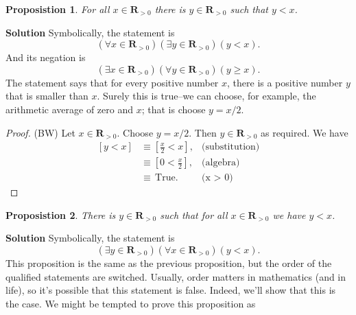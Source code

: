 \documentclass[12pt,fleqn,answers]{exam}
\newcommand{\reals}{\mathbf{R}}
\newcommand{\true}{\, \mathrm{True}}
\newenvironment{myproof}
  {\begin{shaded}\begin{proof}}
  {\end{proof}\end{shaded}}
\newtheorem{prop}{Proposistion}
\begin{document}
    \begin{prop}   For all $x \in \reals_{>0}$ there is 
      $y \in \reals_{> 0}$ such that $y < x$. 
    \end{prop}
     
    \noindent \textbf{Solution} Symbolically, the statement is 
      \begin{equation*}
         \left(\forall x \in \reals_{>0}\right) \left(\exists y \in \reals_{>0}\right)(y < x).
      \end{equation*}
      And its negation is
       \begin{equation*}
         \left(\exists x \in \reals_{>0}\right) \left(\forall y \in \reals_{>0}\right)(y \geq  x).
      \end{equation*}
      The statement says that for every positive number $x$, there is a positive number $y$ that is smaller than $x$. 
      Surely this is true--we can choose, for example, the 
      arithmetic average of zero and $x$; that is choose     
      $y=x/2$.
      
      \begin{myproof} (BW) Let $x \in \reals_{>0}$. Choose $y = x/2$. Then $y \in \reals_{>0}$ as required. We have
         \begin{align*}
         \left[y < x \right] &\equiv \left[\frac{x}{2} < x \right], &\mbox{(substitution)} \\
                                   &\equiv \left[0 < \frac{x}{2}  \right], &\mbox{(algebra)} \\
                                   &\equiv \true.  &\mbox{(x > 0)}
      \end{align*}
      \end{myproof}

      
      \begin{prop} There is $y \in \reals_{> 0}$ such that for all 
        $x \in \reals_{>0}$ we have $y < x$.
      \end{prop}
       
      \noindent \textbf{Solution}  Symbolically, the statement is
       \begin{equation*}
         \left(\exists y \in \reals_{>0}\right)\left(\forall x \in \reals_{>0}\right) \left(y < x \right).
       \end{equation*}
       This proposition is the same as the previous proposition, but
       the order of the qualified statements are switched. Usually,
       order matters in mathematics (and in life), so it's possible 
       that this statement is false. Indeed, we'll show that this 
       is the case. We might be tempted to prove this proposition as
\end{document}
